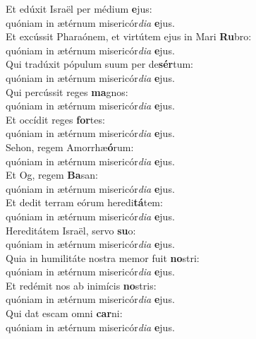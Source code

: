 \evenverse Et edúxit Israël per médium \textbf{e}jus:~\*\\
\evenverse quóniam in ætérnum misericór\textit{di}\textit{a} \textbf{e}jus.\\
\oddverse Et excússit Pharaónem, et virtútem ejus in Mari \textbf{Ru}bro:~\*\\
\oddverse quóniam in ætérnum misericór\textit{di}\textit{a} \textbf{e}jus.\\
\evenverse Qui tradúxit pópulum suum per de\textbf{sér}tum:~\*\\
\evenverse quóniam in ætérnum misericór\textit{di}\textit{a} \textbf{e}jus.\\
\oddverse Qui percússit reges \textbf{ma}gnos:~\*\\
\oddverse quóniam in ætérnum misericór\textit{di}\textit{a} \textbf{e}jus.\\
\evenverse Et occídit reges \textbf{for}tes:~\*\\
\evenverse quóniam in ætérnum misericór\textit{di}\textit{a} \textbf{e}jus.\\
\oddverse Sehon, regem Amorrhæ\textbf{ó}rum:~\*\\
\oddverse quóniam in ætérnum misericór\textit{di}\textit{a} \textbf{e}jus.\\
\evenverse Et Og, regem \textbf{Ba}san:~\*\\
\evenverse quóniam in ætérnum misericór\textit{di}\textit{a} \textbf{e}jus.\\
\oddverse Et dedit terram eórum heredi\textbf{tá}tem:~\*\\
\oddverse quóniam in ætérnum misericór\textit{di}\textit{a} \textbf{e}jus.\\
\evenverse Hereditátem Israël, servo \textbf{su}o:~\*\\
\evenverse quóniam in ætérnum misericór\textit{di}\textit{a} \textbf{e}jus.\\
\oddverse Quia in humilitáte nostra memor fuit \textbf{no}stri:~\*\\
\oddverse quóniam in ætérnum misericór\textit{di}\textit{a} \textbf{e}jus.\\
\evenverse Et redémit nos ab inimícis \textbf{no}stris:~\*\\
\evenverse quóniam in ætérnum misericór\textit{di}\textit{a} \textbf{e}jus.\\
\oddverse Qui dat escam omni \textbf{car}ni:~\*\\
\oddverse quóniam in ætérnum misericór\textit{di}\textit{a} \textbf{e}jus.\\
